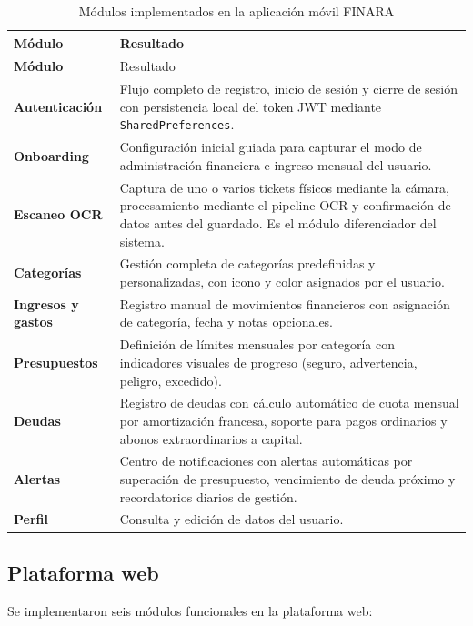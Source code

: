 \begin{longtable}{>{\bfseries\small}p{4cm} p{9.5cm}}
  \caption{Módulos implementados en la aplicación móvil FINARA}
  \label{tab:modulos-movil} \\
  \toprule
  Módulo & Resultado \\
  \midrule
  \endfirsthead
  \toprule
  Módulo & Resultado \\
  \midrule
  \endhead
  Autenticación & Flujo completo de registro, inicio de sesión y
    cierre de sesión con persistencia local del token JWT mediante
    \texttt{SharedPreferences}. \\[4pt]
  Onboarding & Configuración inicial guiada para capturar el modo de
    administración financiera e ingreso mensual del usuario. \\[4pt]
  Escaneo OCR & Captura de uno o varios tickets físicos mediante la
    cámara, procesamiento mediante el pipeline OCR y confirmación de
    datos antes del guardado. Es el módulo diferenciador del sistema. \\[4pt]
  Categorías & Gestión completa de categorías predefinidas y
    personalizadas, con icono y color asignados por el usuario. \\[4pt]
  Ingresos y gastos & Registro manual de movimientos financieros con
    asignación de categoría, fecha y notas opcionales. \\[4pt]
  Presupuestos & Definición de límites mensuales por categoría con
    indicadores visuales de progreso (seguro, advertencia, peligro,
    excedido). \\[4pt]
  Deudas & Registro de deudas con cálculo automático de cuota mensual
    por amortización francesa, soporte para pagos ordinarios y abonos
    extraordinarios a capital. \\[4pt]
  Alertas & Centro de notificaciones con alertas automáticas por
    superación de presupuesto, vencimiento de deuda próximo y
    recordatorios diarios de gestión. \\[4pt]
  Perfil & Consulta y edición de datos del usuario. \\
  \bottomrule
\end{longtable}

\subsection{Plataforma web}

Se implementaron seis módulos funcionales en la plataforma web:

